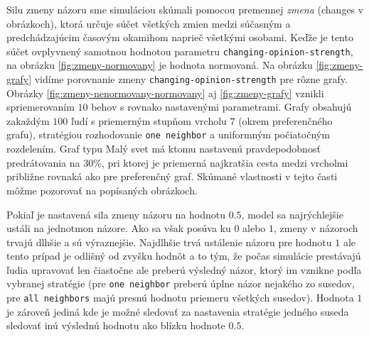 \documentclass[10pt,a4paper]{report}
\begin{document}
Silu zmeny názoru sme simuláciou skúmali pomocou premennej \textit{zmena} (changes v obrázkoch), ktorá určuje súčet všetkých zmien medzi súčasným a predchádzajúcim časovým okamihom naprieč všetkými osobami. Keďže je tento súčet ovplyvnený samotnou hodnotou parametru \texttt{changing-opinion-strength}, na obrázku \ref{fig:zmeny-normovany} je hodnota normovaná. Na obrázku \ref{fig:zmeny-grafy} vidíme porovnanie zmeny \texttt{changing-opinion-strength} pre rôzne grafy. Obrázky \ref{fig:zmeny-nenormovany-normovany} aj \ref{fig:zmeny-grafy} vznikli spriemerovaním $10$ behov s rovnako nastavenými parametrami. Grafy obsahujú zakaždým $100$ ľudí s priemerným stupňom vrcholu $7$ (okrem preferenčného grafu), stratégiou rozhodovanie \texttt{one neighbor} a uniformným počiatočným rozdelením. Graf typu Malý svet má ktomu nastavenú pravdepodobnosť predrátovania na 30\%, pri ktorej je priemerná najkratšia cesta medzi vrcholmi približne rovnaká ako pre preferenčný graf. Skúmané vlastnosti v tejto časti môžme pozorovať na popísaných obrázkoch.  

Pokiaľ je nastavená sila zmeny názoru na hodnotu $0.5$, model sa najrýchlejšie ustáli na jednotmon názore. Ako sa však posúva ku $0$ alebo $1$, zmeny v názoroch trvajú dlhšie a sú výraznejšie. Najdlhšie trvá ustálenie názoru pre hodnotu $1$ ale tento prípad je odlišný od zvyšku hodnôt a to tým, že počas simulácie prestávajú ľudia upravovať len čiastočne ale preberú výsledný názor, ktorý im vznikne podľa vybranej stratégie (pre \texttt{one neighbor} preberú úplne názor nejakého zo susedov, pre \texttt{all neighbors} majú presnú hodnotu priemeru všetkých susedov). Hodnota $1$ je zároveň jediná kde je možné sledovať za nastavenia stratégie jedného suseda sledovať inú výslednú hodnotu ako blízku hodnote $0.5$.
\end{document}
